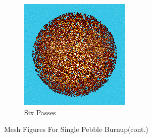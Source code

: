 \begin{figure}[H]
\begin{subfigure}{0.45\textwidth}
  \includegraphics[width=0.95\linewidth]{figures/burn-20-bstep6}
  \caption{Six Passes}
  \label{fig:bstep6}
\end{subfigure}%
%
\caption{Mesh Figures For Single Pebble Burnup(cont.)}
\label{fig:burn-meshes}
\end{figure}